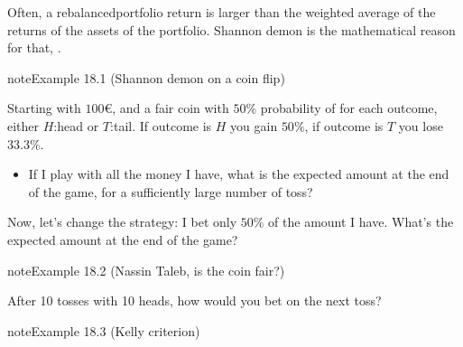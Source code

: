 \documentclass[letterpaper,10pt,english]{jupyterBook}
\begin{document}
\sphinxAtStartPar
Often, a rebalanced\sphinxhyphen{}portfolio return is larger than the weighted average of the returns of the assets of the portfolio. Shannon demon is the mathematical reason for that, .
\label{ch/investing/rebalancing:example-0}
\begin{sphinxadmonition}{note}{Example 18.1 (Shannon demon \sphinxhyphen{} on a coin flip)}



\sphinxAtStartPar
Starting with \(100\)€, and a fair coin with \(50\%\) probability of for each outcome, either \(H\):head or \(T\):tail. If outcome is \(H\) you gain \(50 \%\), if outcome is \(T\) you lose \(33.3 \%\).
\begin{itemize}
\item {} 
\sphinxAtStartPar
If I play with all the money I have, what is the expected amount at the end of the game, for a sufficiently large number of toss?

\end{itemize}

\sphinxAtStartPar
Now, let’s change the strategy: I bet only \(50 \%\) of the amount I have. What’s the expected amount at the end of the game?
\end{sphinxadmonition}
\label{ch/investing/rebalancing:example-1}
\begin{sphinxadmonition}{note}{Example 18.2 (Nassin Taleb, is the coin fair?)}



\sphinxAtStartPar
After 10 tosses with 10 heads, how would you bet on the next toss?
\end{sphinxadmonition}
\label{ch/investing/rebalancing:example-2}
\begin{sphinxadmonition}{note}{Example 18.3 (Kelly criterion)}


\end{sphinxadmonition}
\label{ch/investing/rebalancing:example-3}
\end{document}
